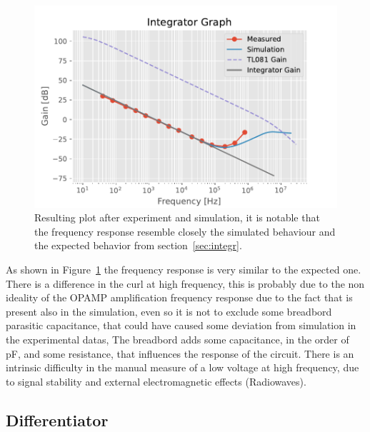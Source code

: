 \documentclass[a4paper, twocolumn]{article}
\begin{document}
\begin{figure}[t]
    \centering
    \includegraphics{def_graph/Exp_Integ_graph.pdf}
    \caption{Resulting plot after experiment and simulation, it is notable that the frequency response resemble closely the simulated behaviour and the expected behavior from section~\ref{sec:integr}.}
    \label{fig:expIntegr}
\end{figure}
As shown in Figure~\ref{fig:expIntegr} the frequency response is very similar to the expected one. There is a difference in the curl at high frequency, this is probably due to the non ideality of the OPAMP amplification frequency response due to the fact that is present also in the simulation, even so it is not to exclude some breadbord parasitic capacitance, that could have caused some deviation from simulation in the experimental datas, The breadbord adds some capacitance, in the order of \unit{\pico\farad}, and some resistance, that influences the response of the circuit. There is an intrinsic difficulty in the manual measure of a low voltage at high frequency, due to signal stability and external electromagnetic effects (Radiowaves).

\subsection{Differentiator}
\end{document}
